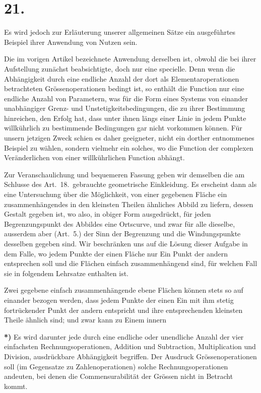 \documentclass{article}
\begin{document}
\section*{21.}

Es wird jedoch zur Erläuterung unserer allgemeinen Sätze ein ausgeführtes Beispiel ihrer Anwendung von Nutzen sein.

Die im vorigen Artikel bezeichnete Anwendung derselben ist, obwohl die bei ihrer Aufstellung zunächst beabsichtigte, doch nur eine specielle. Denn wenn die Abhängigkeit durch eine endliche Anzahl der dort als Elementaroperationen betrachteten Grössenoperationen bedingt ist, so enthält die Function nur eine endliche Anzahl von Parametern, was für die Form eines Systems von einander unabhängiger Grenz- und Unstetigkeitsbedingungen, die zu ihrer Bestimmung hinreichen, den Erfolg hat, dass unter ihnen längs einer Linie in jedem Punkte willkührlich zu bestimmende Bedingungen gar nicht vorkommen können. Für unsern jetzigen Zweck schien es daher geeigneter, nicht ein dorther entnommenes Beispiel zu wählen, sondern vielmehr ein solches, wo die Function der complexen Veränderlichen von einer willkührlichen Function abhängt.

Zur Veranschaulichung und bequemeren Fassung geben wir demselben die am Schlusse des Art.~18.\ gebrauchte geometrische Einkleidung. Es erscheint dann als eine Untersuchung über die Möglichkeit, von einer gegebenen Fläche ein zusammenhängendes in den kleinsten Theilen ähnliches Abbild zu liefern, dessen Gestalt gegeben ist, wo also, in obiger Form ausgedrückt, für jeden Begrenzungspunkt des Abbildes eine Ortscurve, und zwar für alle dieselbe, ausserdem aber (Art.~5.) der Sinn der Begrenzung und die Windungspunkte desselben gegeben sind. Wir beschränken uns auf die Lösung dieser Aufgabe in dem Falle, wo jedem Punkte der einen Fläche nur Ein Punkt der andern entsprechen soll und die Flächen einfach zusammenhängend sind, für welchen Fall sie in folgendem Lehrsatze enthalten ist.

Zwei gegebene einfach zusammenhängende ebene Flächen können stets so auf einander bezogen werden, dass jedem Punkte der einen Ein mit ihm stetig fortrückender Punkt der andern entspricht und ihre entsprechenden kleinsten Theile ähnlich sind; und zwar kann zu Einem innern

\textbf{*)} Es wird darunter jede durch eine endliche oder unendliche Anzahl der vier einfachsten Rechnungsoperationen, Addition und Subtraction, Multiplication und Division, ausdrückbare Abhängigkeit begriffen. Der Ausdruck Grössenoperationen soll (im Gegensatze zu Zahlenoperationen) solche Rechnungsoperationen andeuten, bei denen die Commensurabilität der Grössen nicht in Betracht kommt.
\end{document}
